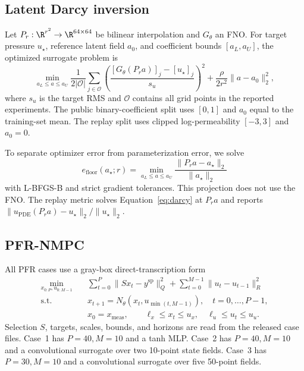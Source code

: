 \subsection{Latent Darcy inversion}

Let $P_r:\R^{r^2}\rightarrow\R^{64\times64}$ be bilinear interpolation and
$G_\theta$ an FNO.  For target pressure $u_\star$, reference latent field
$a_0$, and coefficient bounds $[a_L,a_U]$, the optimized surrogate problem is
\begin{equation}
\min_{a_L\leq a\leq a_U}
\frac{1}{2|\mathcal{O}|}
\sum_{j\in\mathcal{O}}
\left(\frac{[G_\theta(P_r a)]_j-[u_\star]_j}{s_u}\right)^2
+\frac{\rho}{2r^2}\|a-a_0\|_2^2,
\label{eq:darcy-inverse-app}
\end{equation}
where $s_u$ is the target RMS and $\mathcal{O}$ contains all grid points in the
reported experiments.  The public binary-coefficient split uses $[0,1]$ and
$a_0$ equal to the training-set mean.  The replay split uses clipped
log-permeability $[-3,3]$ and $a_0=0$.

To separate optimizer error from parameterization error, we solve
\begin{equation}
e_{\mathrm{floor}}(a_\star;r)=
\min_{a_L\leq a\leq a_U}
\frac{\|P_r a-a_\star\|_2}{\|a_\star\|_2}
\end{equation}
with L-BFGS-B and strict gradient tolerances.  This projection does not use the
FNO.  The replay metric solves Equation~\ref{eq:darcy} at $P_r a$ and reports
$\|u_{\mathrm{PDE}}(P_r a)-u_\star\|_2/\|u_\star\|_2$.

\subsection{PFR-NMPC}

All PFR cases use a gray-box direct-transcription form
\begin{equation}
\begin{aligned}
\min_{x_{0:P},u_{0:M-1}}\quad &
\sum_{t=0}^{P}\|Sx_t-y^{\mathrm{sp}}\|_{Q}^{2}
+\sum_{t=0}^{M-1}\|u_t-u_{t-1}\|_{R}^{2}\\
\mathrm{s.t.}\quad &x_{t+1}=N_\theta(x_t,u_{\min(t,M-1)}),
\quad t=0,\ldots,P-1,\\
&x_0=x_{\mathrm{meas}},\qquad \ell_x\leq x_t\leq u_x,
\quad \ell_u\leq u_t\leq u_u.
\end{aligned}
\label{eq:pfr-app}
\end{equation}
Selection $S$, targets, scales, bounds, and horizons are read from the released
case files.  Case~1 has $P=40,M=10$ and a tanh MLP.  Case~2 has $P=40,M=10$
and a convolutional surrogate over two 10-point state fields.  Case~3 has
$P=30,M=10$ and a convolutional surrogate over five 50-point fields.

